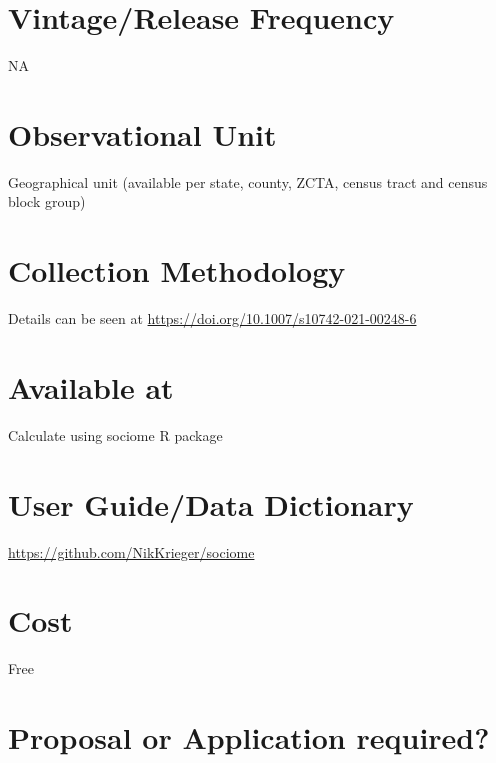\documentclass[
]{book}
\begin{document}
\hypertarget{vintagerelease-frequency-9}{%
\section{Vintage/Release Frequency}\label{vintagerelease-frequency-9}}

NA

\hypertarget{observational-unit-9}{%
\section{Observational Unit}\label{observational-unit-9}}

Geographical unit (available per state, county, ZCTA, census tract and census block group)

\hypertarget{collection-methodology-9}{%
\section{Collection Methodology}\label{collection-methodology-9}}

Details can be seen at \url{https://doi.org/10.1007/s10742-021-00248-6}

\hypertarget{available-at-9}{%
\section{Available at}\label{available-at-9}}

Calculate using sociome R package

\hypertarget{user-guidedata-dictionary-9}{%
\section{User Guide/Data Dictionary}\label{user-guidedata-dictionary-9}}

\url{https://github.com/NikKrieger/sociome}

\hypertarget{cost-9}{%
\section{Cost}\label{cost-9}}

Free

\hypertarget{proposal-or-application-required-9}{%
\section{Proposal or Application required?}\label{proposal-or-application-required-9}}
\end{document}
